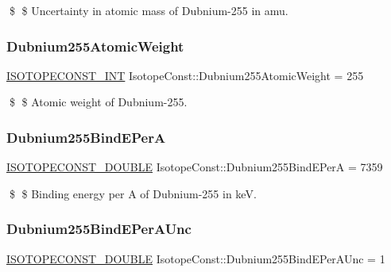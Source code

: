 \$ \$ Uncertainty in atomic mass of Dubnium-\/255 in amu. \mbox{\label{group___isotope_const-_dubnium-_db255_ga0187cf4184652f99e44c1b95c1b2c029}} 
\subsubsection{\texorpdfstring{Dubnium255\+Atomic\+Weight}{Dubnium255AtomicWeight}}
{\footnotesize\ttfamily \mbox{\hyperlink{group___isotope_const-_macros_ga5f18360b3e99483a35c32d789e62621c}{I\+S\+O\+T\+O\+P\+E\+C\+O\+N\+S\+T\+\_\+\+I\+NT}} Isotope\+Const\+::\+Dubnium255\+Atomic\+Weight = 255}

\$ \$ Atomic weight of Dubnium-\/255. \mbox{\label{group___isotope_const-_dubnium-_db255_gaa15f01602878340d355da467c35de48d}} 
\subsubsection{\texorpdfstring{Dubnium255\+Bind\+E\+PerA}{Dubnium255BindEPerA}}
{\footnotesize\ttfamily \mbox{\hyperlink{group___isotope_const-_macros_ga8f45a7272ce02c0b4c65c44636ed719a}{I\+S\+O\+T\+O\+P\+E\+C\+O\+N\+S\+T\+\_\+\+D\+O\+U\+B\+LE}} Isotope\+Const\+::\+Dubnium255\+Bind\+E\+PerA = 7359}

\$ \$ Binding energy per A of Dubnium-\/255 in keV. \mbox{\label{group___isotope_const-_dubnium-_db255_ga0941a2dd5a8c29c63038afe2bc7f8b86}} 
\subsubsection{\texorpdfstring{Dubnium255\+Bind\+E\+Per\+A\+Unc}{Dubnium255BindEPerAUnc}}
{\footnotesize\ttfamily \mbox{\hyperlink{group___isotope_const-_macros_ga8f45a7272ce02c0b4c65c44636ed719a}{I\+S\+O\+T\+O\+P\+E\+C\+O\+N\+S\+T\+\_\+\+D\+O\+U\+B\+LE}} Isotope\+Const\+::\+Dubnium255\+Bind\+E\+Per\+A\+Unc = 1}

